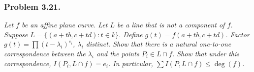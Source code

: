 \documentclass{article}
\begin{document}



\subsubsection*{Problem 3.21.}
\emph{Let $f$ be an affine plane curve.
Let $L$ be a line that is not a component of $f$.
Suppose $L = \{(a+tb, c+td) : t \in k \}$.
Define $g(t) = f(a+tb, c+td)$.
Factor $g(t) = \prod (t - \lambda_i)^{e_i}$, $\lambda_i$ distinct.
Show that there is a natural one-to-one correspondence between
the $\lambda_i$ and the points $P_i \in L \cap f$.
Show that under this correspondence, $I(P_i, L \cap f) = e_i$.
In particular, $\sum I(P, L \cap f) \leq \deg(f)$.} \\
\end{document}

